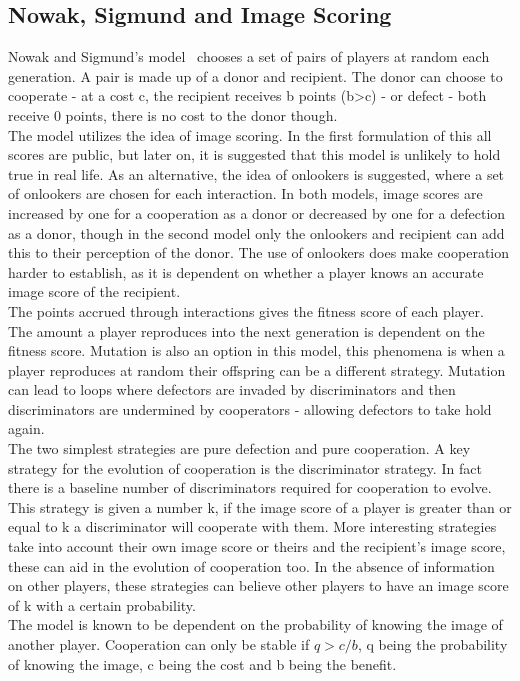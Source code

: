 \documentclass[twoside,twocolumn]{article}
\begin{document}
\subsection{Nowak, Sigmund and Image Scoring}
Nowak and Sigmund's model~\cite{evol_indirect_image} chooses a set of pairs of players at random each generation. A pair is made up of a donor and recipient. The donor can choose to cooperate - at a cost c, the recipient receives b points (b>c) - or defect - both receive 0 points, there is no cost to the donor though.\\
The model utilizes the idea of image scoring. In the first formulation of this all scores are public, but later on, it is suggested that this model is unlikely to hold true in real life. As an alternative, the idea of onlookers is suggested, where a set of onlookers are chosen for each interaction. In both models, image scores are increased by one for a cooperation as a donor or decreased by one for a defection as a donor, though in the second model only the onlookers and recipient can add this to their perception of the donor. The use of onlookers does make cooperation harder to establish, as it is dependent on whether a player knows an accurate image score of the recipient.\\
The points accrued through interactions gives the fitness score of each player. The amount a player reproduces into the next generation is dependent on the fitness score. Mutation is also an option in this model, this phenomena is when a player reproduces at random their offspring can be a different strategy. Mutation can lead to loops where defectors are invaded by discriminators and then discriminators are undermined by cooperators - allowing defectors to take hold again.\\
The two simplest strategies are pure defection and pure cooperation. A key strategy for the evolution of cooperation is the discriminator strategy. In fact there is a baseline number of discriminators required for cooperation to evolve. This strategy is given a number k, if the image score of a player is greater than or equal to k a discriminator will cooperate with them. More interesting strategies take into account their own image score or theirs and the recipient's image score, these can aid in the evolution of cooperation too. In the absence of information on other players, these strategies can believe other players to have an image score of k with a certain probability.\\
The model is known to be dependent on the probability of knowing the image of another player. Cooperation can only be stable if $q > c/b$, q being the probability of knowing the image, c being the cost and b being the benefit.\\
\end{document}
